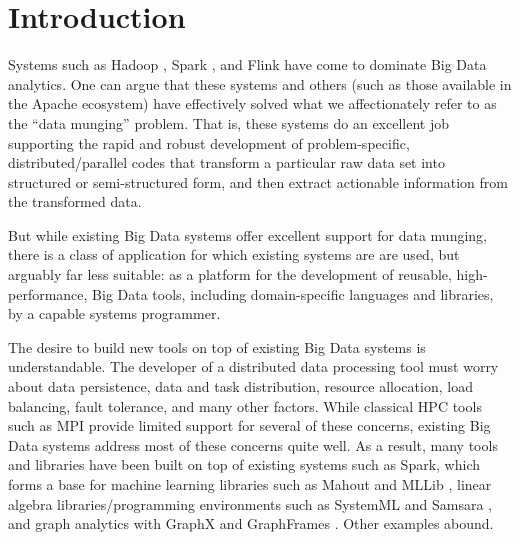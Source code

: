 
\section{Introduction}

Systems such as Hadoop \cite{}, Spark \cite{}, and Flink \cite{} 
have come to dominate  
Big Data analytics.
One can argue that these systems and others 
(such as those available in the Apache ecosystem)
have effectively solved what we affectionately refer to as the ``data munging'' problem.  That is, 
these systems do an excellent job supporting the rapid
and robust development of problem-specific,
distributed/parallel codes that transform a particular raw data set into structured or semi-structured form, and then
extract actionable information from the transformed data.

But while existing Big Data systems offer
excellent support for data munging,
there is a class of application for which 
existing systems are 
are
used, but arguably far less suitable:
as a platform 
for the development of reusable, high-performance, Big Data tools, including domain-specific languages and libraries, by a capable
systems programmer.

The desire to build new tools
on top of existing Big Data systems is understandable.  
The  developer of a distributed data processing tool must worry about data persistence, data
and task distribution, resource allocation, load balancing, fault tolerance, and many other factors.
While classical HPC tools such as MPI provide limited support for several of these concerns,
existing Big Data systems 
address most of these concerns quite well.
As a result, many tools and libraries have been built on top of existing systems such as
Spark, which forms a base for 
machine learning libraries such as Mahout \cite{}
and MLLib \cite{}, linear algebra libraries/programming environments such as SystemML \cite{} and Samsara \cite{}, and graph analytics with
GraphX \cite{} and GraphFrames \cite{}.  Other examples abound.


